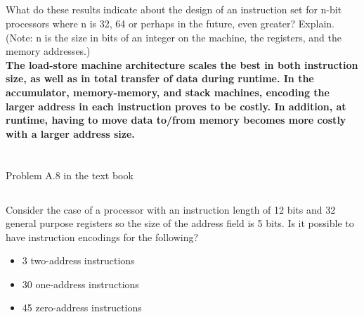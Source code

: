 \documentclass{article}
\begin{document}
\subsection{}
What do these results indicate about the design of an instruction set for n-bit processors where n is 32, 64 or perhaps in the future, even greater? Explain. (Note: n is the size in bits of an integer on the machine, the registers, and the memory addresses.)\\
\textbf{The load-store machine architecture scales the best in both instruction size, as well as in total transfer of data during runtime. In the accumulator, memory-memory, and stack machines, encoding the larger address in each instruction proves to be costly. In addition, at runtime, having to move data  to/from memory becomes more costly with a larger address size. }
\section{}
Problem A.8 in the text book\\
\subsection{}
    Consider the case of a processor with an instruction length of 12 bits and 32 general purpose registers so the size of the address field is 5 bits. Is it possible to have instruction encodings for the following?
    \begin{itemize}
        \item 3 two-address instructions
        \item 30 one-address instructions
        \item 45 zero-address instructions
    \end{itemize}
    \vspace{5mm}
\end{document}
